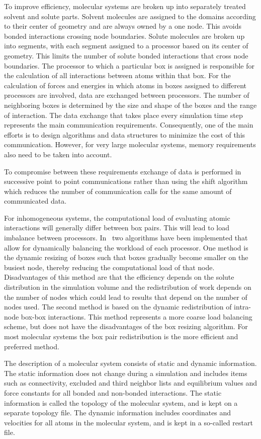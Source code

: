\par
To improve efficiency, molecular systems are broken up into separately
treated solvent and solute parts.
Solvent molecules are assigned to the domains according to their
center of geometry and are always owned by a one node. This avoids 
bonded interactions crossing node boundaries. 
Solute molecules are broken up into segments, with each 
segment assigned to a processor based on its center of geometry. 
This limits the number of solute bonded interactions that cross node 
boundaries.
The processor to which a particular box is assigned is responsible for
the calculation of all interactions between atoms within that box.
For the calculation of forces and energies in which atoms in
boxes assigned to different processors are involved, data are
exchanged between processors. The number of neighboring boxes is 
determined by the size and shape of the boxes and the range of 
interaction. The data exchange that takes place every simulation time 
step represents the main communication requirements.
Consequently, one of the main efforts is to design algorithms and
data structures to minimize the cost of this communication. However, 
for very large molecular systems, memory requirements also need to be 
taken into account. 
\par
To compromise between these requirements exchange of data is performed
in successive point to point communications rather than using the
shift algorithm which reduces the number of communication calls
for the same amount of communicated data.
\par
For inhomogeneous systems, the computational load of evaluating 
atomic interactions will generally differ between box pairs. 
This will lead to load imbalance between processors. In \nwargos\ 
two algorithms have been implemented that allow for dynamically 
balancing the workload of each processor.
One method is the dynamic resizing of boxes such that boxes gradually
become smaller on the busiest node, thereby reducing the computational
load of that node. Disadvantages of this method are that the 
efficiency depends on the solute distribution in the simulation volume
and the redistribution of work depends on the number of nodes which
could lead to results that depend on the number of nodes used.
The second method is based on the dynamic redistribution of intra-node
box-box interactions. This method represents a more coarse load
balancing scheme, but does not have the disadvantages of the box
resizing algorithm. For most molecular systems the box pair
redistribution is the more efficient and preferred  method.
\par
The description of a molecular system consists of static and dynamic
information. The static information does not change during a
simulation and includes items such as connectivity, excluded and third
neighbor lists and equilibrium values and force constants for all
bonded and non-bonded interactions. The static information is called
the topology of the molecular system, and is kept on a separate
topology file. The dynamic information includes coordinates and
velocities for all atoms in the molecular system, and is kept in a
so-called restart file.
